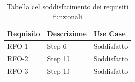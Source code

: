 \begin{table}[!h]%
	\begin{tabularx}{\textwidth}{lXl}
		\hline\hline
		\textbf{Requisito} & \textbf{Descrizione} & \textbf{Use Case}\\
		\hline
		RFO-1     & Step 6 & Soddisfatto \\
		RFO-2     & Step 10 & Soddisfatto\\
		RFO-3     & Step 10 & Soddisfatto\\
		\hline
	\end{tabularx}
	\caption{Tabella del soddisfacimento dei requisiti funzionali}
	\label{tab:requisiti-funzionali-soddisfatti}
\end{table}%